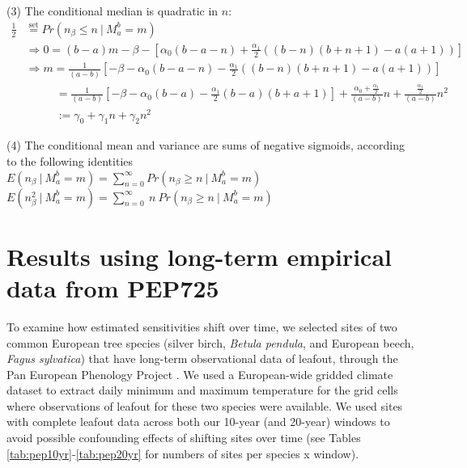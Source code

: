 \documentclass[11pt]{article}
\begin{document}
(3) The conditional median is quadratic in $n$: \\

\begin{align*}
\frac{1}{2} & \overset{\text{set}}{=} Pr \left ( n_{\beta} \leq n \ \big |  \ M_a^b = m \right )  \\
& \Rightarrow 0 = (b-a) m - \beta -    [ \alpha_0 (b - a - n) + \frac{\alpha_1}{2} ( (b-n)(b+n+1) - a(a+1) ) ] \\
& \Rightarrow m = \frac{1}{(a-b)} [-  \beta -  \alpha_0 (b - a - n) - \frac{\alpha_1}{2} ( (b-n)(b+n+1) - a(a+1) ) ] \\
& \phantom{\Rightarrow m} \ = \frac{1}{(a-b)} [- \beta -  \alpha_0 (b - a ) - \frac{\alpha_1}{2} (b-a)(b+a+1) ] + \frac{\alpha_0 + \frac{\alpha_1}{2}}{(a-b)} n +  \frac{ \frac{\alpha_1}{2} }{(a-b)} n^2  \\
& \phantom{\Rightarrow m} \ := \gamma_0 + \gamma_1 n + \gamma_2 n^2 
\end{align*}

(4) The conditional mean and variance are sums of negative sigmoids, according to the following identities \\

$E \left ( n_{\beta} \ \big |  \ M_{a}^b = m \right ) =  \sum_{n=0}^{\infty} Pr \left ( n_{\beta} \geq n \ \big |  \ M_{a}^b = m \right )$ \\

$E \left ( n_{\beta}^2 \ \big |  \ M_{a}^b = m \right ) =  \sum_{n=0}^{\infty} \ n \  Pr \left ( n_{\beta} \geq n \ \big |  \ M_{a}^b = m \right )$ \\

\section{Results using long-term empirical data from PEP725} %
To examine how estimated sensitivities shift over time, we selected sites of two common European tree species (silver birch, \emph{Betula pendula}, and European beech, \emph{Fagus sylvatica}) that have long-term observational data of leafout, through the Pan European Phenology Project \citep[PEP725,][]{Templ2018}. We used a European-wide gridded climate dataset \emph{\citep[{\normalfont E-OBS},][]{cornes2018}} to extract daily minimum and maximum temperature for the grid cells where observations of leafout for these two species were available. We used sites with complete leafout data across both our 10-year (and 20-year) windows to avoid possible confounding effects of shifting sites over time (see Tables \ref{tab:pep10yr}-\ref{tab:pep20yr} for numbers of sites per species x window). \\
\end{document}
